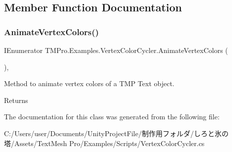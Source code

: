 \subsection{Member Function Documentation}
\mbox{\label{class_t_m_pro_1_1_examples_1_1_vertex_color_cycler_a22a41f2f64cdf007330973d283d61d8e}} 
\subsubsection{\texorpdfstring{Animate\+Vertex\+Colors()}{AnimateVertexColors()}}
{\footnotesize\ttfamily I\+Enumerator T\+M\+Pro.\+Examples.\+Vertex\+Color\+Cycler.\+Animate\+Vertex\+Colors (\begin{DoxyParamCaption}{ }\end{DoxyParamCaption})\hspace{0.3cm}{\ttfamily [inline]}, {\ttfamily [private]}}



Method to animate vertex colors of a T\+MP Text object. 

\begin{DoxyReturn}{Returns}

\end{DoxyReturn}


The documentation for this class was generated from the following file\+:\begin{DoxyCompactItemize}
\item 
C\+:/\+Users/user/\+Documents/\+Unity\+Project\+File/制作用フォルダ/しろと氷の塔/\+Assets/\+Text\+Mesh Pro/\+Examples/\+Scripts/Vertex\+Color\+Cycler.\+cs\end{DoxyCompactItemize}
